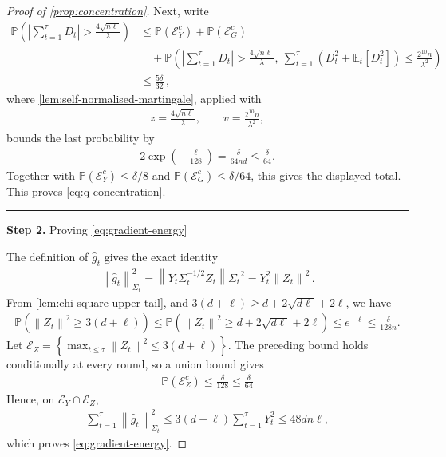 \documentclass[11pt]{article}
\newcommand{\proofstep}[2]{%
    \par\medskip
    \noindent
    \textcolor{blue!55!black}{\rule{2pt}{1.2em}}%
    \hspace{0.6em}%
    {\sffamily\bfseries\color{blue!55!black}Step #1}%
    \quad
    {\sffamily #2}%
    \par\smallskip
}
\newcommand{\E}{\mathbb E}
\newcommand{\Pp}{\mathbb P}
\newcommand{\1}{\mathbf 1}
\newcommand{\norm}[1]{\left\lVert #1\right\rVert}
\newcommand{\normm}[2]{\left\lVert #1\right\rVert_{#2}}
\begin{document}
\begin{proof}[Proof of \cref{prop:concentration}]
    Next, write
    \begin{align}
        \Pp\left(
        \left|\sum_{t=1}^\tau D_t\right|>
        \frac{4\sqrt{n\ell}}{\lambda}
        \right)
         & \leq
        \Pp(\mathcal E_Y^c)
        +\Pp(\mathcal E_G^c)
        \\
         & \quad+
        \Pp\left(
        \left|\sum_{t=1}^\tau D_t\right|>
        \frac{4\sqrt{n\ell}}{\lambda},
        \ \sum_{t=1}^\tau(D_t^2+\E_t[D_t^2])
        \leq\frac{2^{10}n}{\lambda^2}
        \right)
        \\
         & \leq
        \frac{5\delta}{32}\,,
    \end{align}
    where \cref{lem:self-normalised-martingale}, applied with
    \begin{align}
        z=\frac{4\sqrt{n\ell}}{\lambda},
        \qquad
        v=\frac{2^{10}n}{\lambda^2},
    \end{align}
    bounds the last probability by
    \begin{align}
        2\exp\left(-\frac{\ell}{128}\right)
        =\frac{\delta}{64nd}
        \leq\frac{\delta}{64}.
    \end{align}
    Together with
    $\Pp(\mathcal E_Y^c)\leq\delta/8$ and
    $\Pp(\mathcal E_G^c)\leq\delta/64$, this gives the displayed total.
    This proves
    \eqref{eq:q-concentration}.

    \proofstep{2.}{Proving \eqref{eq:gradient-energy}}
    The definition of $\widehat g_t$ gives the exact identity
    \begin{align}
        \normm{\widehat g_t}{\Sigma_t}^2
        =
        \norm{Y_t\Sigma_t^{-1/2}Z_t}{\Sigma_t}^2
        =
        Y_t^2\norm{Z_t}^2\,.
    \end{align}
    From \cref{lem:chi-square-upper-tail}, and $3(d + \ell) \geq d + 2\sqrt{d\ell} + 2\ell$, we have
    \begin{align}
        \Pp\left(
        \norm{Z_t}^2
        \geq 3(d+\ell)
        \right)
        \leq
        \Pp\left(
        \norm{Z_t}^2
        \geq
        d + 2\sqrt{d\ell} + 2\ell
        \right)
        \leq
        e^{-\ell}
        \leq
        \frac{\delta}{128n}.
    \end{align}
    Let
    $\mathcal E_Z
        =\left\{
        \max_{t\leq\tau}\norm{Z_t}^2\leq 3(d+\ell)
        \right\}$.
    The preceding bound holds conditionally at every round, so a union bound
    gives
    \begin{align}
        \Pp(\mathcal E_Z^c)\leq\frac{\delta}{128}\leq\frac{\delta}{64}
        \label{eq:Z-norm-union}
    \end{align}
    Hence, on $\mathcal E_Y\cap\mathcal E_Z$,
    \begin{align}
        \sum_{t=1}^{\tau}
        \normm{\widehat g_t}{\Sigma_t}^2
        \leq
        3(d+\ell)\sum_{t=1}^{\tau}Y_t^2
        \leq 48dn\ell,
    \end{align}
    which proves \eqref{eq:gradient-energy}.


\end{proof}
\end{document}
